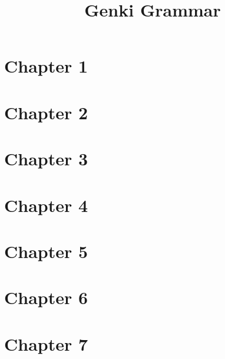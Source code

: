 \documentclass{article}
\title{Genki Grammar}
\makeatletter
\newcommand{\getCurrentSectionNumber}{%
  \ifnum\c@section=0 %
  \thechapter
  \else
  \ifnum\c@subsection=0 %
  \thesection
  \else
  \ifnum\c@subsubsection=0 %
  \thesubsection
  \else
  \thesubsubsection
  \fi
  \fi
  \fi
}
\newcommand{\inputchapter}[2]{\section{Chapter #1}\label{\getCurrentSectionNumber}}
\makeatother
\begin{document}
\tableofcontents

\inputchapter{1}{01.tex}
\inputchapter{2}{02.tex}
\inputchapter{3}{03.tex}
\inputchapter{4}{04.tex}
\inputchapter{5}{05.tex}
\inputchapter{6}{06.tex}
\inputchapter{7}{07.tex}
\end{document}

